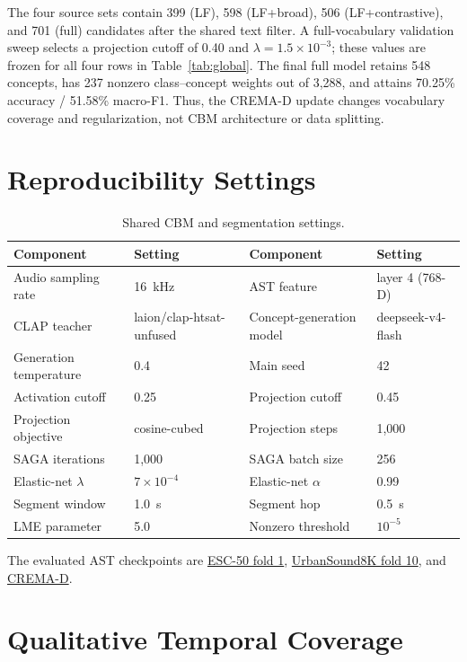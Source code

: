 \documentclass[10pt]{article}
\begin{document}
The four source sets contain 399 (LF), 598 (LF+broad), 506 (LF+contrastive), and 701 (full) candidates after the shared text filter. A full-vocabulary validation sweep selects a projection cutoff of 0.40 and $\lambda=1.5\times10^{-3}$; these values are frozen for all four rows in Table~\ref{tab:global}. The final full model retains 548 concepts, has 237 nonzero class--concept weights out of 3,288, and attains 70.25\% accuracy / 51.58\% macro-F1. Thus, the CREMA-D update changes vocabulary coverage and regularization, not CBM architecture or data splitting.

\section{Reproducibility Settings}
\label{app:reproducibility}
\label{app:implementation}
\begin{table}[h]
\centering
\small
\caption{Shared CBM and segmentation settings.}
\label{tab:implementation}
\begin{tabular}{llll}
\toprule
Component & Setting & Component & Setting \\
\midrule
Audio sampling rate & 16~kHz & AST feature & layer 4 (768-D) \\
CLAP teacher & laion/clap-htsat-unfused & Concept-generation model & deepseek-v4-flash \\
Generation temperature & 0.4 & Main seed & 42 \\
Activation cutoff & 0.25 & Projection cutoff & 0.45 \\
Projection objective & cosine-cubed & Projection steps & 1,000 \\
SAGA iterations & 1,000 & SAGA batch size & 256 \\
Elastic-net $\lambda$ & $7\times10^{-4}$ & Elastic-net $\alpha$ & 0.99 \\
Segment window & 1.0~s & Segment hop & 0.5~s \\
LME parameter & 5.0 & Nonzero threshold & $10^{-5}$ \\
\bottomrule
\end{tabular}
\end{table}

The evaluated AST checkpoints are \href{https://huggingface.co/Adam-ousse/ast-esc50-finetuned-fold1}{ESC-50 fold 1}, \href{https://huggingface.co/Adam-ousse/ast-urbansound8k-finetuned-fold10}{UrbanSound8K fold 10}, and \href{https://huggingface.co/Adam-ousse/ast-cremad-finetuned}{CREMA-D}.

\section{Qualitative Temporal Coverage}
\label{app:temporal_gallery}
\end{document}
